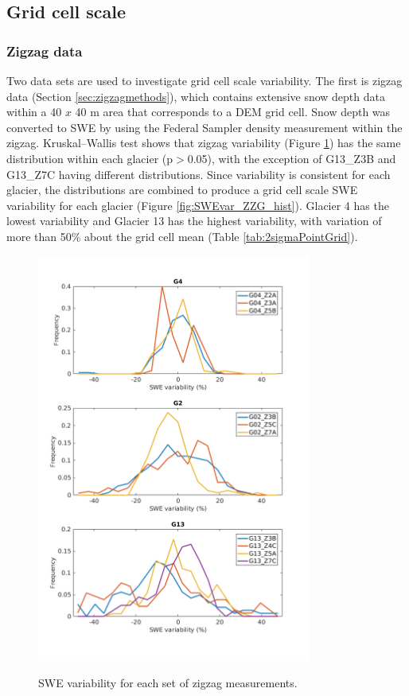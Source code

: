 \documentclass{sfuthesis}
\begin{document}
\subsection{Grid cell scale}

\subsubsection{Zigzag data}
Two data sets are used to investigate grid cell scale variability. The first is zigzag data (Section \ref{sec:zigzagmethods}), which contains extensive snow depth data within a 40 $x$ 40 m area that corresponds to a DEM grid cell. Snow depth was converted to SWE by using the Federal Sampler density measurement within the zigzag. Kruskal--Wallis test shows that zigzag variability (Figure \ref{fig:SWEvar_ZZ_hist}) has the same distribution within each glacier (p$>$0.05), with the exception of G13\_Z3B and G13\_Z7C having different distributions. Since variability is consistent for each glacier, the distributions are combined to produce a grid cell scale SWE variability for each glacier (Figure \ref{fig:SWEvar_ZZG_hist}). Glacier 4 has the lowest variability and Glacier 13 has the highest variability, with variation of more than 50\% about the grid cell mean (Table  \ref{tab:2sigmaPointGrid}). 

\begin{figure}[H]
	\centering
	\includegraphics[width =0.8\textwidth]{ZigzagPDF.png}\\
	\caption{SWE variability for each set of zigzag measurements.}
	\label{fig:SWEvar_ZZ_hist}
\end{figure}
\end{document}
